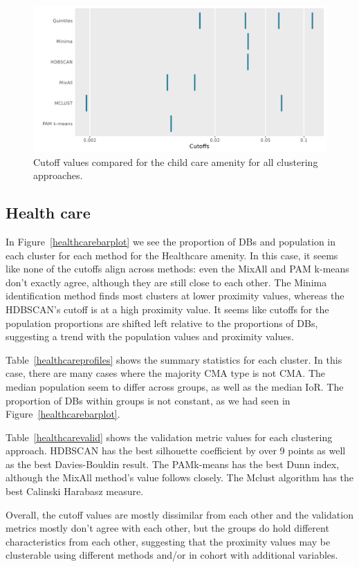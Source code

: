 \documentclass[11pt, a4paper]{article}
\begin{document}
\begin{figure}[H]
\centering
\includegraphics[width=\textwidth]{./cutoff_ticks/Child care_ticks.png}
\caption[Child care cutoff comparison]{Cutoff values compared for the child care amenity for all clustering approaches.}\label{childcareticks}
\end{figure}






\pagebreak
\justifying
\subsection{Health care}

In Figure~\ref{healthcarebarplot} we see the proportion of DBs and population in each cluster for each method for the Healthcare amenity. In this case, it seems like none of the cutoffs align across methods: even the MixAll and PAM k-means don’t exactly agree, although they are still close to each other. The Minima identification method finds most clusters at lower proximity values, whereas the HDBSCAN’s cutoff is at a high proximity value. It seems like cutoffs for the population proportions are shifted left relative to the proportions of DBs, suggesting a trend with the population values and proximity values.
\par
Table~\ref{healthcareprofiles} shows the summary statistics for each cluster. In this case, there are many cases where the majority CMA type is not CMA. The median population seem to differ across groups, as well as the median IoR. The proportion of DBs within groups is not constant, as we had seen in Figure~\ref{healthcarebarplot}.
\par
Table~\ref{healthcarevalid} shows the validation metric values for each clustering approach. HDBSCAN has the best silhouette coefficient by over 9 points as well as the best Davies-Bouldin result. The PAMk-means has the best Dunn index, although the MixAll method’s value follows closely. The Mclust algorithm has the best Calinski Harabasz measure.
\par
Overall, the cutoff values are mostly dissimilar from each other and the validation metrics mostly don’t agree with each other, but the groups do hold different characteristics from each other, suggesting that the proximity values may be clusterable using different methods and/or in cohort with additional variables.
\end{document}
